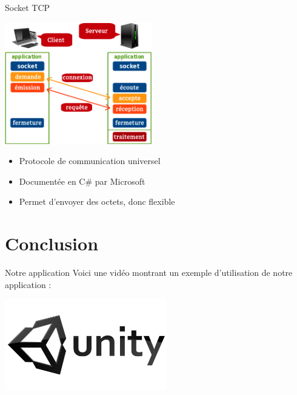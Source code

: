\documentclass[a4paper,10pt]{beamer}
\begin{document}
	
	\begin{frame}{Socket TCP}
		\centerline{\includegraphics[height=150pt]{images/network/tcp-socket6.png}}
			\begin{itemize}
				\item \pause Protocole de communication universel \pause
				\item Documentée en C\# par Microsoft \pause
				\item Permet d'envoyer des octets, donc flexible
			\end{itemize}
	\end{frame}
	
	\section{Conclusion}
	
	\begin{frame}{Notre application}
		Voici une vidéo montrant un exemple d'utilisation de notre application :
		
		\href{run:PresentationAppli.wmv}{\includegraphics[width=200pt]{images/techno/unity-logo.png}}
	\end{frame}
	
\end{document}
